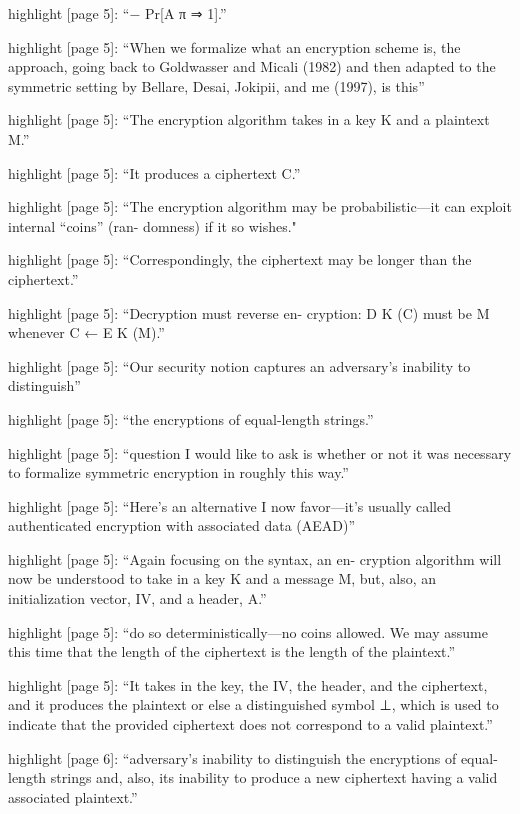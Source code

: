 highlight {[}page 5{]}: ``− Pr{[}A π ⇒ 1{]}.''

highlight {[}page 5{]}: ``When we formalize what an encryption scheme
is, the approach, going back to Goldwasser and Micali (1982) and then
adapted to the symmetric setting by Bellare, Desai, Jokipii, and me
(1997), is this''

highlight {[}page 5{]}: ``The encryption algorithm takes in a key K and
a plaintext M.''

highlight {[}page 5{]}: ``It produces a ciphertext C.''

highlight {[}page 5{]}: ``The encryption algorithm may be
probabilistic---it can exploit internal ``coins'' (ran- domness) if it
so wishes."

highlight {[}page 5{]}: ``Correspondingly, the ciphertext may be
longer than the ciphertext.''

highlight {[}page 5{]}: ``Decryption must reverse en- cryption: D K (C)
must be M whenever C ← E K (M).''

highlight {[}page 5{]}: ``Our security notion captures an adversary's
inability to distinguish''

highlight {[}page 5{]}: ``the encryptions of equal-length strings.''

highlight {[}page 5{]}: ``question I would like to ask is whether or not
it was necessary to formalize symmetric encryption in roughly this
way.''

highlight {[}page 5{]}: ``Here's an alternative I now favor---it's
usually called authenticated encryption with associated data (AEAD)''

highlight {[}page 5{]}: ``Again focusing on the syntax, an en- cryption
algorithm will now be understood to take in a key K and a message M,
but, also, an initialization vector, IV, and a header, A.''

highlight {[}page 5{]}: ``do so deterministically---no coins allowed. We may assume this time that the length of the ciphertext is the length of the plaintext.''

highlight {[}page 5{]}: ``It takes in the key, the IV, the header, and
the ciphertext, and it produces the plaintext or else a distinguished
symbol ⊥, which is used to indicate that the provided ciphertext does
not correspond to a valid plaintext.''

highlight {[}page 6{]}: ``adversary's inability to distinguish the
encryptions of equal-length strings and, also, its inability to produce
a new ciphertext having a valid associated plaintext.''

